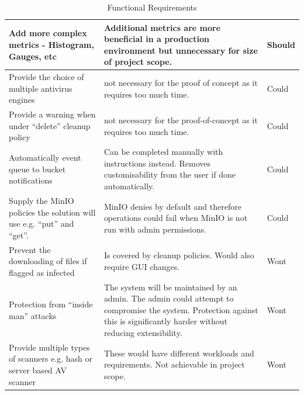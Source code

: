 \documentclass[12pt, conference, final, a4paper, onecolumn, compsoc]{IEEEtran}
\begin{document}
\begin{table}[H]
\begin{tabular}{|p{}|p{}|l|}
    Add more complex metrics - Histogram, Gauges, etc & Additional metrics are
                                                        more beneficial in a production environment but unnecessary for size of project
                                                        scope. & Should \\ \hline \hline Provide the choice of multiple antivirus
    engines & not necessary for the proof of concept as it requires too much time. &
                                                                                     Could \\ \hline Provide a warning when under ``delete'' cleanup policy & not
                                                                                                                                                              necessary for the proof-of-concept as it requires too much time. & Could \\
    \hline Automatically event queue to bucket notifications & Can be completed
                                                               manually with instructions instead. Removes customisability from the user if
                                                               done automatically. & Could \\ \hline Supply the MinIO policies the solution
    will use e.g. ``put'' and ``get''. & MinIO denies by default and therefore
                                         operations could fail when MinIO is not run with admin permissions. & Could \\
    \hline \hline

    Prevent the downloading of files if flagged as infected & Is
                                                              covered by cleanup policies. Would also require GUI changes. & Wont \\ \hline
    Protection from ``inside man'' attacks & The system will be maintained by an
                                             admin. The admin could attempt to compromise the system. Protection against this
                                             is significantly harder without reducing extensibility. & Wont \\ \hline Provide
    multiple types of scanners e.g. hash or server based AV scanner & These would
                                                                      have different workloads and requirements. Not achievable in project scope. &
                                                                                                                                                    Wont \\ \hline
  \end{tabular}
  \caption{Functional Requirements}
  \label{tab:functional-reqs}
\end{table}
\end{document}
